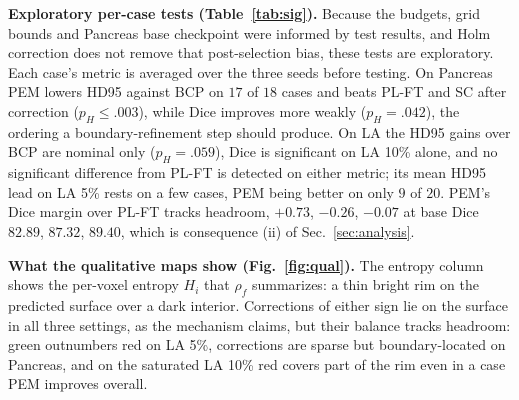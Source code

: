 \documentclass[conference]{IEEEtran}
\begin{document}
\noindent\textbf{Exploratory per-case tests (Table~\ref{tab:sig}).}
Because the budgets, grid bounds and Pancreas base checkpoint were informed by test results, and Holm correction does not remove that post-selection bias, these tests are exploratory. Each case's metric is averaged over the three seeds before testing. On Pancreas PEM lowers HD95 against BCP on $17$ of $18$ cases and beats PL-FT and SC after correction ($p_H\le.003$), while Dice improves more weakly ($p_H=.042$), the ordering a boundary-refinement step should produce. On LA the HD95 gains over BCP are nominal only ($p_H=.059$), Dice is significant on LA 10\% alone, and no significant difference from PL-FT is detected on either metric; its mean HD95 lead on LA 5\% rests on a few cases, PEM being better on only $9$ of $20$. PEM's Dice margin over PL-FT tracks headroom, $+0.73$, $-0.26$, $-0.07$ at base Dice $82.89$, $87.32$, $89.40$, which is consequence (ii) of Sec.~\ref{sec:analysis}.

\noindent\textbf{What the qualitative maps show (Fig.~\ref{fig:qual}).}
The entropy column shows the per-voxel entropy $H_i$ that $\rho_f$ summarizes: a thin bright rim on the predicted surface over a dark interior. Corrections of either sign lie on the surface in all three settings, as the mechanism claims, but their balance tracks headroom: green outnumbers red on LA 5\%, corrections are sparse but boundary-located on Pancreas, and on the saturated LA 10\% red covers part of the rim even in a case PEM improves overall.
\end{document}
